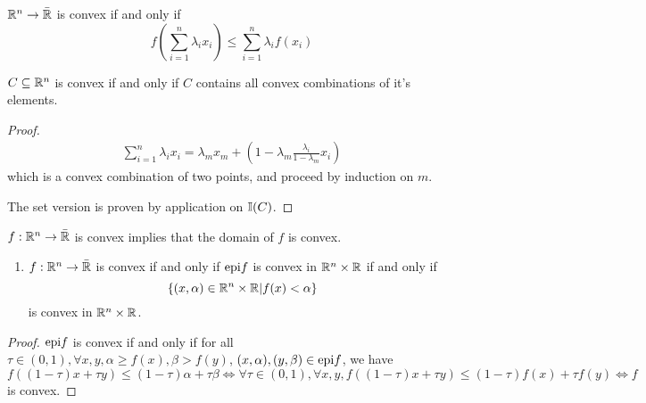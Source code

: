 \begin{thm}
  \label{defn:convexity:3}
  $\mathbb{R}^{n} \rightarrow \bar {\mathbb{R}}$ is convex if and only if
  \begin{equation}
    \label{eq:13}
    f(\sum_{i=1}^{n} \lambda_{i} x_{i}) \leq \sum_{i=1}^{n}
    \lambda_{i} f(x_{i})
  \end{equation}

  $C \subseteq \mathbb{R}^{n}$ is convex if and only if $C$ contains all
  convex combinations of it's elements.
\end{thm}
\begin{proof}
  \begin{align}
    \sum_{i=1}^{n} \lambda_{i} x_{i} = \lambda_{m} x_{m} +
    (1-\lambda_{m} \frac{\lambda_{i}}{1 - \lambda_{m}} x_{i})
  \end{align} which is a convex combination of two points, and proceed
  by induction on $m$.

  The set version is proven by application on $\I{C}$.
\end{proof}

\begin{proposition}
  $f: \mathbb{R}^{n} \rightarrow \bar {\mathbb{R}}$ is convex implies that the domain of
  $f$ is convex.
\end{proposition}

\NewDocumentCommand{\Epi}{g}{%
  \IfNoValueTF{#1}
    {%
      \text{epi}\xspace
    }   
    {%
      \text{epi}\xspace #1
    }%
}


\begin{proposition}
  \begin{enumerate}
  \item $f: \mathbb{R}^{n} \rightarrow \bar {\mathbb{R}}$ is convex if and only if
    $\Epi{f}$ is convex in $\mathbb{R}^{n} \times \mathbb{R}$ if and only if
    \begin{equation}
      \label{eq:14}
      \{ (x, \alpha) \in \mathbb{R}^{n} \times \mathbb{R} | f(x) < \alpha \}
    \end{equation} is convex in $\mathbb{R}^{n} \times \mathbb{R}$.
  \end{enumerate}
\end{proposition}


\begin{proof}
  $\Epi{f}$ is convex if and only if for all $\tau \in (0, 1), \forall
  x, y, \alpha \geq f(x), \beta > f(y)$, $(x, \alpha), (y, \beta) \in
  \Epi{f}$, we have  $f((1-\tau)x + \tau y) \leq (1-\tau)\alpha + \tau
  \beta \iff \forall \tau \in (0,1), \forall x, y, f((1-\tau)x + \tau
  y) \leq (1-\tau) f(x) + \tau f(y) \iff f$ is convex. 
\end{proof}

